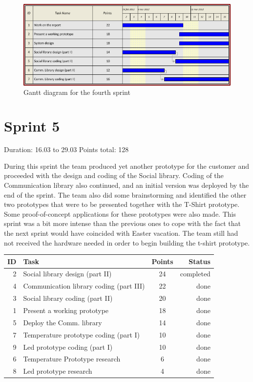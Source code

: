 \begin{figure}[h!]
\centering \includegraphics[scale=0.8]{img/sprints-gantt4.png}
\caption{Gantt diagram for the fourth sprint}
\label{fig:sprints-gantt4}
\end{figure}

\newpage

\section{Sprint 5}

Duration: 16.03 to 29.03
Points total: 128

During this sprint the team produced yet another prototype for the customer
and proceeded with the design and coding of the Social library.
Coding of the Communication library also continued, and an initial version
was deployed by the end of the sprint. The team also did some brainstorming
and identified the other two prototypes that were to be presented together with
the T-Shirt prototype. Some proof-of-concept applications for these
prototypes were also made. This sprint was a bit more intense than the previous
ones to cope with the fact that the next sprint would have coincided with Easter vacation.
The team still had not received the hardware needed in order to begin building the t-shirt
prototype.

\begin{table}[ht!]
\begin{tabular}{ | r | l | c | r | }

\hline
\textbf{ID} & \textbf{Task} & \textbf{Points} & \textbf{Status} \\
\hline

 2 & Social library design (part II)			& 24 & completed \\
\hline
 4 & Communication library coding (part III)	& 22 & done \\
\hline
 3 & Social library coding (part II)			& 20 & done \\
\hline
 1 & Present a working prototype				& 18 & done \\
\hline
 5 & Deploy the Comm. library					& 14 & done \\
\hline
 7 & Temperature prototype coding (part I)		& 10 & done \\
\hline
 9 & Led prototype coding (part I)				& 10 & done \\
\hline
 6 & Temperature Prototype research				& 6  & done \\
\hline
 8 & Led prototype research						& 4  & done \\
\hline


\end{tabular}
\end{table}


